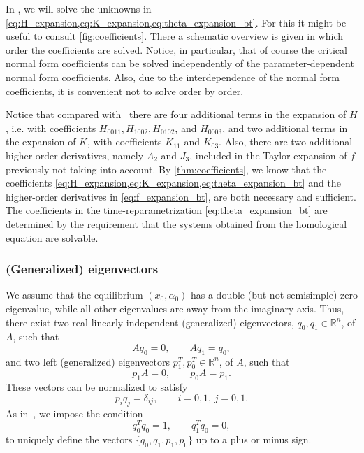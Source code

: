 %
In ,
we will solve the unknowns in
\cref{eq:H_expansion,eq:K_expansion,eq:theta_expansion_bt}. For this it might
be useful to consult \cref{fig:coefficients}. There a schematic overview is
given in which order the coefficients are solved. Notice, in particular, that
of course the critical normal form coefficients can be solved independently
of the parameter-dependent normal form coefficients. Also, due to the
interdependence of the normal form coefficients, it is convenient not to solve
order by order. 

\begin{remark}
\label{rem:correction_cmt}
Notice that compared with~\cite{Al-Hdaibat2016} there are four additional terms
in the expansion of $H$, i.e. with  coefficients $H_{0011},H_{1002},H_{0102}$,
and $H_{0003}$, and two additional terms in the expansion of $K$, with
coefficients $K_{11}$ and $K_{03}$. Also, there are two additional higher-order
derivatives, namely $A_2$ and $J_3$, included in the Taylor expansion of $f$
previously not taking into account. By \cref{thm:coefficients}, we know that
the coefficients \cref{eq:H_expansion,eq:K_expansion,eq:theta_expansion_bt} and
the higher-order derivatives in \cref{eq:f_expansion_bt}, are both necessary
and sufficient. The coefficients in the time-reparametrization \cref{eq:theta_expansion_bt}
are determined by the requirement that the systems obtained from the homological
equation are solvable.
\end{remark}

\subsubsection{(Generalized) eigenvectors}
\label{subsubsection:generalized_eigenvectors}
We assume that the equilibrium $(x_0, \alpha_0)$ has a double (but not
semisimple) zero eigenvalue, while all other eigenvalues are away from the
imaginary axis. Thus, there exist two real linearly independent (generalized)
eigenvectors, $q_0, q_1 \in \mathbb{R}^{n}$, of $A$, such that 
\begin{equation}
\label{eq:eigenvectors}
Aq_0=0,\qquad Aq_1=q_0,
\end{equation}
and two left (generalized) eigenvectors $p_1^T, p_0^T \in\mathbb{R}^{n}$,
of $A$, such that
\[
p_1 A=0,\qquad p_0 A=p_1.
\]
These vectors can be normalized to satisfy
\[
p_i q_j=\delta_{ij},\qquad i=0,1,\,j=0,1.
\]
%
As in~\cite{Kuznetsov2005practical}, we impose the condition
\begin{equation}
\label{eq:q0} 
q_0^T q_0=1,\qquad q_1^T q_0=0,
\end{equation}
to uniquely define the vectors $\{q_0,q_1,p_1,p_0\}$ up to a plus or minus sign.

